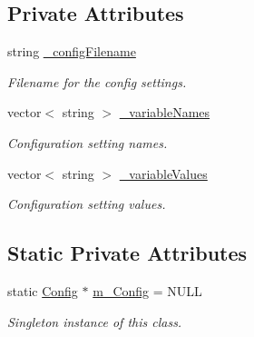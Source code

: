 \subsection*{Private Attributes}
\begin{DoxyCompactItemize}
\item 
\hypertarget{class_config_af1ed2d021c072989764936c3f9504acc}{
string \hyperlink{class_config_af1ed2d021c072989764936c3f9504acc}{\_\-configFilename}}
\label{class_config_af1ed2d021c072989764936c3f9504acc}

\begin{DoxyCompactList}\small\item\em Filename for the config settings. \end{DoxyCompactList}\item 
\hypertarget{class_config_ac5188c8628ffcddfca6a4e059c1dfdce}{
vector$<$ string $>$ \hyperlink{class_config_ac5188c8628ffcddfca6a4e059c1dfdce}{\_\-variableNames}}
\label{class_config_ac5188c8628ffcddfca6a4e059c1dfdce}

\begin{DoxyCompactList}\small\item\em Configuration setting names. \end{DoxyCompactList}\item 
\hypertarget{class_config_a2486ffad0cc6b7bf9b39a4845aec3f62}{
vector$<$ string $>$ \hyperlink{class_config_a2486ffad0cc6b7bf9b39a4845aec3f62}{\_\-variableValues}}
\label{class_config_a2486ffad0cc6b7bf9b39a4845aec3f62}

\begin{DoxyCompactList}\small\item\em Configuration setting values. \end{DoxyCompactList}\end{DoxyCompactItemize}
\subsection*{Static Private Attributes}
\begin{DoxyCompactItemize}
\item 
\hypertarget{class_config_a4744d7e5d36a855e1ec8bf51e8193fef}{
static \hyperlink{class_config}{Config} $\ast$ \hyperlink{class_config_a4744d7e5d36a855e1ec8bf51e8193fef}{m\_\-Config} = NULL}
\label{class_config_a4744d7e5d36a855e1ec8bf51e8193fef}

\begin{DoxyCompactList}\small\item\em Singleton instance of this class. \end{DoxyCompactList}\end{DoxyCompactItemize}


